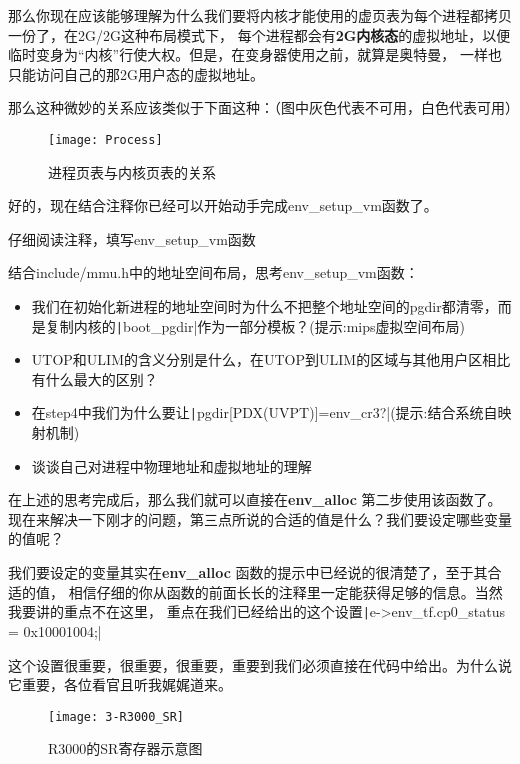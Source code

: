 那么你现在应该能够理解为什么我们要将内核才能使用的虚页表为每个进程都拷贝一份了，在2G/2G这种布局模式下，
每个进程都会有\textbf{2G内核态}的虚拟地址，以便临时变身为“内核”行使大权。但是，在变身器使用之前，就算是奥特曼，
一样也只能访问自己的那2G用户态的虚拟地址。

那么这种微妙的关系应该类似于下面这种：（图中灰色代表不可用，白色代表可用）
\begin{figure}[htbp]
  \centering
  \texttt{[image: Process]}
  \caption{进程页表与内核页表的关系}\label{fig:Process} 
\end{figure}

好的，现在结合注释你已经可以开始动手完成env\_setup\_vm函数了。

\begin{exercise}
    仔细阅读注释，填写env\_setup\_vm函数
\end{exercise}

\begin{thinking}\label{think-env_setup_vm}
结合include/mmu.h中的地址空间布局，思考env\_setup\_vm函数：
\begin{itemize}
\item 我们在初始化新进程的地址空间时为什么不把整个地址空间的pgdir都清零，而是复制内核的\texttt|boot_pgdir|作为一部分模板？(提示:mips虚拟空间布局)
\item {\small UTOP}和{\small ULIM}的含义分别是什么，在{\small UTOP}到{\small ULIM}的区域与其他用户区相比有什么最大的区别？
\item 在step4中我们为什么要让\texttt|pgdir[PDX(UVPT)]=env_cr3?|(提示:结合系统自映射机制)
\item 谈谈自己对进程中物理地址和虚拟地址的理解
\end{itemize}
\end{thinking}

在上述的思考完成后，那么我们就可以直接在\textbf{env\_alloc} 第二步使用该函数了。
现在来解决一下刚才的问题，第三点所说的合适的值是什么？我们要设定哪些变量的值呢？

我们要设定的变量其实在\textbf{env\_alloc} 函数的提示中已经说的很清楚了，至于其合适的值，
相信仔细的你从函数的前面长长的注释里一定能获得足够的信息。当然我要讲的重点不在这里，
重点在我们已经给出的这个设置\texttt|e->env_tf.cp0_status = 0x10001004;|

这个设置很重要，很重要，很重要，重要到我们必须直接在代码中给出。为什么说它重要，各位看官且听我娓娓道来。

\begin{figure}[htbp]
  \centering
  \texttt{[image: 3-R3000\_SR]}
  \caption{R3000的SR寄存器示意图}\label{fig:3-R3000_SR} 
\end{figure}

